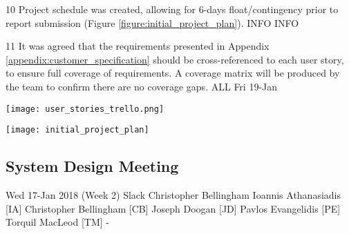 \begin{momitems}
	\momitem
	{10}
	{Project schedule was created, allowing for 6-days float/contingency prior to report submission (Figure \ref{figure:initial_project_plan}).}
	{INFO}
	{INFO}

	\momitem
	{11}
	{It was agreed that the requirements presented in Appendix \ref{appendix:customer_specification} should be cross-referenced to each user story, to ensure full coverage of requirements. 
	A coverage matrix will be produced by the team to confirm there are no coverage gaps.}
	{ALL}
	{Fri 19-Jan}
\end{momitems}

\begin{center}
	\texttt{[image: user\_stories\_trello.png]}
	\label{fig:user_stories_trello}
\end{center}

\begin{center}
	\texttt{[image: initial\_project\_plan]}
	\label{figure:initial_project_plan}
\end{center}


\newpage
\subsection{System Design Meeting}
\label{appendix:design_meeting}

\momtoptable
{Wed 17-Jan 2018 (Week 2)}
{Slack}
{Christopher Bellingham}
{Ioannis Athanasiadis [IA]\newline
Christopher Bellingham [CB]\newline
Joseph Doogan [JD]\newline
Pavlos Evangelidis [PE]\newline
Torquil MacLeod [TM]}
{-}

